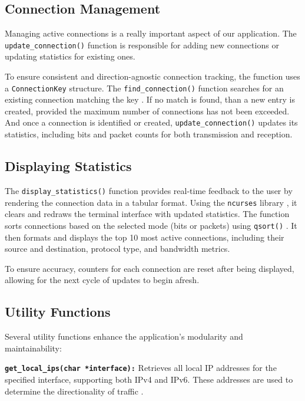 \documentclass[12pt]{extarticle}
\begin{document}
\subsection{Connection Management}

Managing active connections is a really important aspect of our application. The \texttt{update\_connection()} function is responsible for adding new connections or updating statistics for existing ones.

To ensure consistent and direction-agnostic connection tracking, the function uses a \texttt{ConnectionKey} structure. The \texttt{find\_connection()} function searches for an existing connection matching the key \cite{beej}. If no match is found, than a new entry is created, provided the maximum number of connections has not been exceeded. And once a connection is identified or created, \texttt{update\_connection()} updates its statistics, including bits and packet counts for both transmission and reception.

\subsection{Displaying Statistics}

The \texttt{display\_statistics()} function provides real-time feedback to the user by rendering the connection data in a tabular format. Using the \texttt{ncurses} library \cite{ncurses}, it clears and redraws the terminal interface with updated statistics. The function sorts connections based on the selected mode (bits or packets) using \texttt{qsort()} \cite{linuxman}. It then formats and displays the top 10 most active connections, including their source and destination, protocol type, and bandwidth metrics.

To ensure accuracy, counters for each connection are reset after being displayed, allowing for the next cycle of updates to begin afresh.

\subsection{Utility Functions}

Several utility functions enhance the application's modularity and maintainability:

\textbf{\texttt{get\_local\_ips(char *interface):}} Retrieves all local IP addresses for the specified interface, supporting both IPv4 and IPv6. These addresses are used to determine the directionality of traffic \cite{linuxman}.
\end{document}
